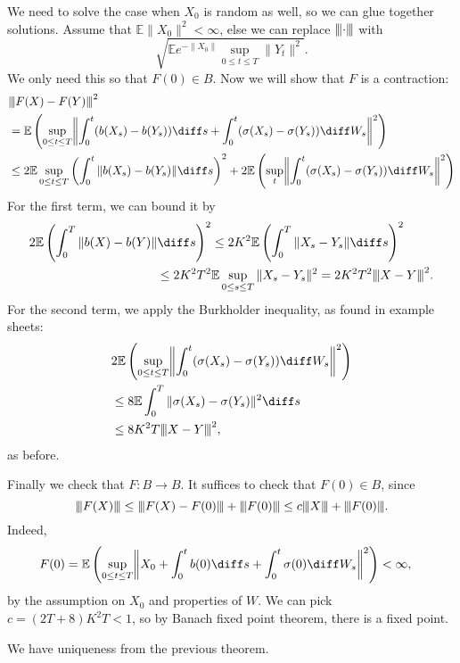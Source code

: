 \documentclass[12pt]{article}
\newcommand{\vertiii}[1]{{\left\vert\kern-0.25ex\left\vert\kern-0.25ex\left\vert #1 \right\vert\kern-0.25ex\right\vert\kern-0.25ex\right\vert}}
\begin{document}
\begin{proofbox}
	We need to solve the case when $X_0$ is random as well, so we can glue together solutions. Assume that $\mathbb{E} \|X_0\|^2 < \infty$, else we can replace $\vertiii{\cdot}$ with
	\[
		\sqrt{\mathbb{E} e^{-\|X_0\|} \sup_{0 \leq t \leq T} \|Y_t\|^2}.
	\]
	We only need this so that $F(0) \in B$. Now we will show that $F$ is a contraction:
	\begin{align*}
		&\vertiii{F(X) - F(Y)}^2 \\
		&= \mathbb{E}\left( \sup_{ 0 \leq t \leq T} \biggl\|\int_0^{t} (b(X_s) - b(Y_s)) \diff s + \int_0^{t} (\sigma(X_s) - \sigma(Y_s)) \diff W_s\biggr\|^2 \right) \\
					&\leq 2 \mathbb{E} \sup_{0 \leq t \leq T} \left( \int_0^{t} \|b(X_s) - b(Y_s)\| \diff s\right)^2 + 2 \mathbb{E} \left( \sup_t \biggl\|\int_0^{t} ( \sigma(X_s) - \sigma(Y_s)) \diff W_s\biggr\|^2 \right)
	\end{align*}
	For the first term, we can bound it by
	\begin{align*}
		2 \mathbb{E} \left( \int_0^{T} \|b(X) - b(Y)\| \diff s \right)^2 & \leq 2 K^2 \mathbb{E} \left( \int_0^{T} \|X_s - Y_s\| \diff s \right)^2 \\
		\leq 2 K^2 T^2 &\mathbb{E} \sup_{0 \leq s \leq T} \|X_s - Y_s\|^2 = 2 K^2 T^2 \vertiii{X - Y}^2.
	\end{align*}
	For the second term, we apply the Burkholder inequality, as found in example sheets:
	\begin{align*}
		&2 \mathbb{E} \left( \sup_{0 \leq t \leq T} \biggl\|\int_0^{t} (\sigma(X_s) - \sigma(Y_s)) \diff W_s\biggr\|^2 \right) \\
		&\leq 8 \mathbb{E} \int_0^{T} \|\sigma(X_s) - \sigma(Y_s)\|^2 \diff s \\
		&\leq 8 K^2 T \vertiii{X - Y}^2,
	\end{align*}
	as before.

	Finally we check that $F : B \to B$. It suffices to check that $F(0) \in B$, since
	\[
		\vertiii{F(X)} \leq \vertiii{F(X) - F(0)} + \vertiii{F(0)} \leq c \vertiii{X} + \vertiii{F(0)}.
	\]
	Indeed,
	\begin{align*}
		F(0) &= \mathbb{E} \left( \sup_{0 \leq t \leq T} \biggl\|X_0 + \int_0^{t} b(0) \diff s + \int_0^{t} \sigma(0) \diff W_s\biggr\|^2 \right) < \infty,
	\end{align*}
	by the assumption on $X_0$ and properties of $W$. We can pick $c = (2T + 8)K^2 T < 1$, so by Banach fixed point theorem, there is a fixed point.

	We have uniqueness from the previous theorem.
\end{proofbox}
\end{document}
